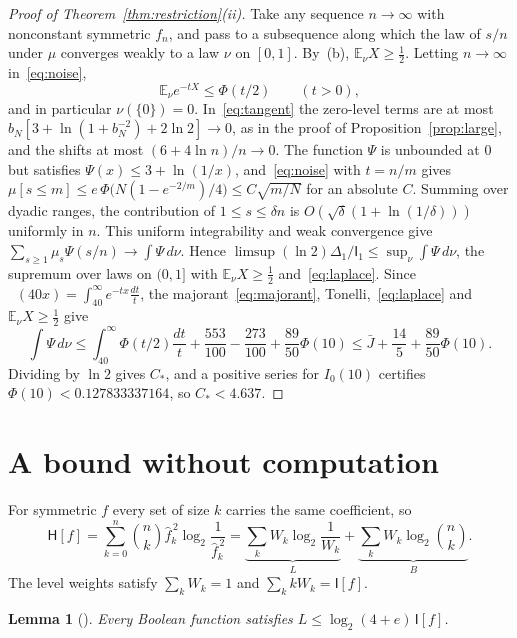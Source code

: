 \documentclass[11pt]{amsart}
\newtheorem{lemma}[theorem]{Lemma}
\theoremstyle{definition}
\theoremstyle{remark}
\newcommand{\E}{\mathbb E}
\newcommand{\HH}{\mathsf H}
\newcommand{\I}{\mathsf I}
\newcommand{\wh}[1]{\widehat{#1}}
\DeclareMathOperator{\Ei}{E_1}
\begin{document}
\begin{proof}[Proof of Theorem~\ref{thm:restriction}(ii)]
Take any sequence $n\to\infty$ with nonconstant symmetric $f_n$, and pass to a subsequence along which the law of $s/n$ under $\mu$ converges weakly to a law $\nu$ on $[0,1]$. By~(b), $\E_\nu X\ge\frac12$. Letting $n\to\infty$ in~\eqref{eq:noise},
\begin{equation}\label{eq:laplace}
 \E_\nu e^{-tX}\le\Phi(t/2)\qquad(t>0),
\end{equation}
and in particular $\nu(\{0\})=0$. In~\eqref{eq:tangent} the zero-level terms are at most $b_N[3+\ln(1+b_N^{-2})+2\ln2]\to0$, as in the proof of Proposition~\ref{prop:large}, and the shifts at most $(6+4\ln n)/n\to0$. The function $\Psi$ is unbounded at $0$ but satisfies $\Psi(x)\le3+\ln(1/x)$, and~\eqref{eq:noise} with $t=n/m$ gives $\mu[s\le m]\le e\,\Phi\bigl(N(1-e^{-2/m})/4\bigr)\le C\sqrt{m/N}$ for an absolute $C$. Summing over dyadic ranges, the contribution of $1\le s\le\delta n$ is $O(\sqrt\delta(1+\ln(1/\delta)))$ uniformly in $n$. This uniform integrability and weak convergence give $\sum_{s\ge1}\mu_s\Psi(s/n)\to\int\Psi\,d\nu$. Hence $\limsup(\ln2)\Delta_1/\I_1\le\sup_\nu\int\Psi\,d\nu$, the supremum over laws on $(0,1]$ with $\E_\nu X\ge\frac12$ and~\eqref{eq:laplace}. Since $\Ei(40x)=\int_{40}^\infty e^{-tx}\frac{dt}t$, the majorant~\eqref{eq:majorant}, Tonelli,~\eqref{eq:laplace} and $\E_\nu X\ge\frac12$ give
\[
 \int\Psi\,d\nu\le\int_{40}^\infty\Phi(t/2)\frac{dt}t+\frac{553}{100}-\frac{273}{100}+\frac{89}{50}\Phi(10)\le\bar J+\frac{14}5+\frac{89}{50}\Phi(10).
\]
Dividing by $\ln2$ gives $C_*$, and a positive series for $I_0(10)$ certifies $\Phi(10)<0.127833337164$, so $C_*<4.637$.
\end{proof}

\section{A bound without computation}\label{sec:analytic}

For symmetric $f$ every set of size $k$ carries the same coefficient, so
\begin{equation}\label{eq:split}
 \HH[f]=\sum_{k=0}^n\binom nk\wh f_k^{\,2}\log_2\frac{1}{\wh f_k^{\,2}}
 =\underbrace{\sum_kW_k\log_2\frac1{W_k}}_{L}+\underbrace{\sum_kW_k\log_2\binom nk}_{B}.
\end{equation}
The level weights satisfy $\sum_kW_k=1$ and $\sum_kkW_k=\I[f]$.

\begin{lemma}[{\cite[Lemma~2.1]{Shm26}}]\label{lem:level}
Every Boolean function satisfies $L\le\log_2(4+e)\,\I[f]$.
\end{lemma}
\end{document}
